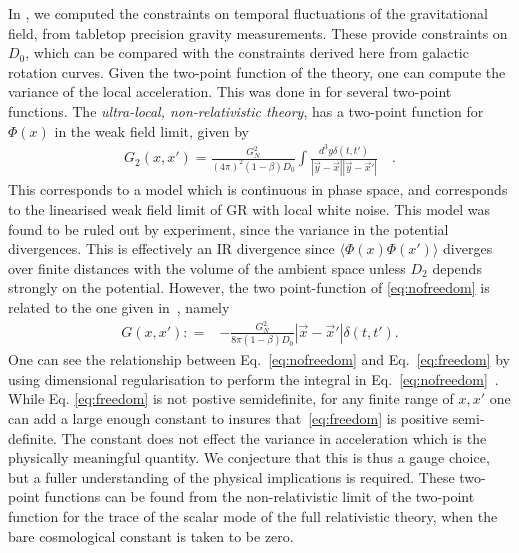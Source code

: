 \documentclass[aps,pra,amsmath,amssymb,amsthm,floatfix,nofootinbib,notitlepage,superscriptaddress,10pt]{revtex4-2}
\begin{document}
In \cite{oppenheim2023gravitationally}, we computed the constraints on temporal fluctuations of the gravitational field, from tabletop precision gravity measurements. These provide constraints on $D_0$, which can be compared with the constraints derived here from galactic rotation curves.
Given the two-point function of the theory, one can compute the variance of the local acceleration. This was done in \cite{oppenheim2023gravitationally} for several two-point functions. The {\it ultra-local, non-relativistic theory}, has a two-point function for $\Phi(x)$ in the weak field limit, given by
\begin{align}
	G_2(x,x')=\frac{G_N^2}{(4\pi)^2(1-\beta)D_{0}}\int\frac{ d^3y \delta(t,t')}{|\vec{y}-\vec{x}||\vec{y}-\vec{x}'|}\quad .
	\label{eq:nofreedom}
\end{align}
This corresponds to a model which is continuous in phase space, and corresponds to the linearised weak field limit of GR with local white noise. This model was found to be ruled out by experiment, since the variance in the potential divergences. This is effectively an IR divergence since $\langle\Phi(x)\Phi(x')\rangle$ diverges over finite distances with the volume of the ambient space unless $D_2$ depends strongly on the potential.
However, the two point-function of \eqref{eq:nofreedom} is related to the one given in~\cite{grudka2023renormalisable}, namely
\begin{align}
	G(x,x'):
	=&-\frac{G_N^2}{8 \pi (1-\beta)D_0}|\vec{x}-\vec{x}'|\delta(t,t').
	\label{eq:freedom}
\end{align}
One can see the relationship between Eq.~\eqref{eq:nofreedom} and Eq.~\eqref{eq:freedom} by using dimensional regularisation to perform the integral in Eq.~\eqref{eq:nofreedom}~\cite{morris2024dim}. 
While Eq. \eqref{eq:freedom} is not postive semidefinite, for any finite range of $x,x'$ one can add a large enough constant to insures that~\eqref{eq:freedom} is positive semi-definite. The constant does not effect the variance in acceleration which is the physically meaningful quantity. We conjecture that this is thus a gauge choice, but a fuller understanding of the physical implications is required. 
These two-point functions can be found from the non-relativistic limit of the two-point function for the trace of the scalar mode of the full relativistic theory, when the bare cosmological constant is taken to be zero.
\end{document}
